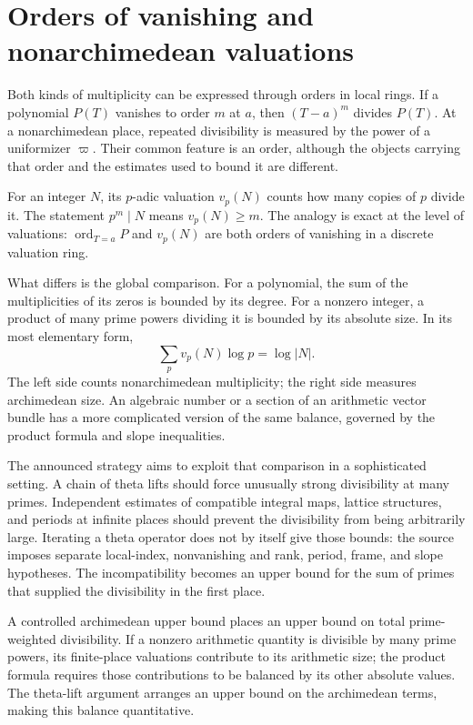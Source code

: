 \documentclass[11pt,openany,oneside]{scrbook}
\theoremstyle{definition}
\theoremstyle{remark}
\begin{document}
\section{Orders of vanishing and nonarchimedean valuations}

Both kinds of multiplicity can be expressed through orders in local rings. If a polynomial $P(T)$ vanishes to order $m$ at $a$, then $(T-a)^m$ divides $P(T)$. At a nonarchimedean place, repeated divisibility is measured by the power of a uniformizer $\varpi$. Their common feature is an order, although the objects carrying that order and the estimates used to bound it are different.

For an integer $N$, its $p$-adic valuation $v_p(N)$ counts how many copies of $p$ divide it. The statement $p^m\mid N$ means $v_p(N)\ge m$. The analogy is exact at the level of valuations: $\operatorname{ord}_{T=a}P$ and $v_p(N)$ are both orders of vanishing in a discrete valuation ring.

What differs is the global comparison. For a polynomial, the sum of the multiplicities of its zeros is bounded by its degree. For a nonzero integer, a product of many prime powers dividing it is bounded by its absolute size. In its most elementary form,
\[
\sum_p v_p(N)\log p=\log|N|.
\]
The left side counts nonarchimedean multiplicity; the right side measures archimedean size. An algebraic number or a section of an arithmetic vector bundle has a more complicated version of the same balance, governed by the product formula and slope inequalities.

The announced strategy aims to exploit that comparison in a sophisticated setting. A chain of theta lifts should force unusually strong divisibility at many primes. Independent estimates of compatible integral maps, lattice structures, and periods at infinite places should prevent the divisibility from being arbitrarily large.  Iterating a theta operator does not by itself give those bounds: the source imposes separate local-index, nonvanishing and rank, period, frame, and slope hypotheses. The incompatibility becomes an upper bound for the sum of primes that supplied the divisibility in the first place.

A controlled archimedean upper bound places an upper bound on total prime-weighted divisibility. If a nonzero arithmetic quantity is divisible by many prime powers, its finite-place valuations contribute to its arithmetic size; the product formula requires those contributions to be balanced by its other absolute values. The theta-lift argument arranges an upper bound on the archimedean terms, making this balance quantitative.
\end{document}
